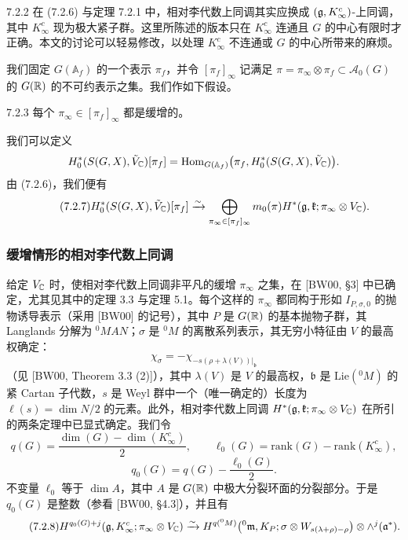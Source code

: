 \begin{rem}{7.2.2}\label{thm:a6-04-14}
在 (7.2.6) 与定理 7.2.1 中，相对李代数上同调其实应换成 $(\mathfrak{g},K^c_\infty)$-上同调，其中 $K^c_\infty$ 现为极大紧子群。这里所陈述的版本只在 $K^c_\infty$ 连通且 $G$ 的中心有限时才正确。本文的讨论可以轻易修改，以处理 $K^c_\infty$ 不连通或 $G$ 的中心所带来的麻烦。
\end{rem}

我们固定 $G(\mathbb{A}_f)$ 的一个表示 $\pi_f$，并令 $[\pi_f]_\infty$ 记满足 $\pi=\pi_\infty\otimes\pi_f\subset\mathcal A_0(G)$ 的 $G(\mathbb{R})$ 的不可约表示之集。我们作如下假设。

\begin{hyp}{7.2.3}\label{thm:a6-04-15}
每个 $\pi_\infty\in[\pi_f]_\infty$ 都是缓增的。
\end{hyp}

我们可以定义
\[
H^*_0(S(G,X),\tilde V_{\mathbb{C}})[\pi_f]=\mathrm{Hom}_{G(\mathbb{A}_f)}\bigl(\pi_f,H^*_0(S(G,X),\tilde V_{\mathbb{C}})\bigr).
\]
由 (7.2.6)，我们便有
\begin{equation}\tag{7.2.7}\label{eq:a6-04-17}
H^*_0(S(G,X),\tilde V_{\mathbb{C}})[\pi_f]\xrightarrow{\sim}
\bigoplus_{\pi_\infty\in[\pi_f]_\infty}m_0(\pi)H^*(\mathfrak{g},\mathfrak{k};\pi_\infty\otimes V_{\mathbb{C}}).
\end{equation}

\subsubsection{缓增情形的相对李代数上同调}

给定 $V_{\mathbb{C}}$ 时，使相对李代数上同调非平凡的缓增 $\pi_\infty$ 之集，在 [BW00, §3] 中已确定，尤其见其中的定理 3.3 与定理 5.1。每个这样的 $\pi_\infty$ 都同构于形如 $I_{P,\sigma,0}$ 的抛物诱导表示（采用 [BW00] 的记号），其中 $P$ 是 $G(\mathbb{R})$ 的基本抛物子群，其 Langlands 分解为 ${}^0MAN$；$\sigma$ 是 ${}^0M$ 的离散系列表示，其无穷小特征由 $V$ 的最高权确定：
\[
\chi_\sigma=-\chi_{-s(\rho+\lambda(V))|_{\mathfrak b}}
\]
（见 [BW00, Theorem 3.3 (2)]），其中 $\lambda(V)$ 是 $V$ 的最高权，$\mathfrak b$ 是 $\mathrm{Lie}({}^0M)$ 的紧 Cartan 子代数，$s$ 是 Weyl 群中一个（唯一确定的）长度为 $\ell(s)=\dim N/2$ 的元素。此外，相对李代数上同调 $H^*(\mathfrak{g},\mathfrak{k};\pi_\infty\otimes V_{\mathbb{C}})$ 在所引的两条定理中已显式确定。我们令
\[
q(G)=\frac{\dim(G)-\dim(K^c_\infty)}{2},\qquad
\ell_0(G)=\mathrm{rank}(G)-\mathrm{rank}(K^c_\infty),
\]
\[
q_0(G)=q(G)-\frac{\ell_0(G)}{2}.
\]
不变量 $\ell_0$ 等于 $\dim A$，其中 $A$ 是 $G(\mathbb{R})$ 中极大分裂环面的分裂部分。于是 $q_0(G)$ 是整数（参看 [BW00, §4.3]），并且有
\begin{equation}\tag{7.2.8}\label{eq:a6-04-18}
H^{q_0(G)+j}(\mathfrak{g},K^c_\infty;\pi_\infty\otimes V_{\mathbb{C}})\xrightarrow{\sim}
H^{q({}^0M)}\bigl({}^0\mathfrak{m},K_P;\sigma\otimes W_{s(\lambda+\rho)-\rho}\bigr)\otimes\wedge^j(\mathfrak{a}^*).
\end{equation}

